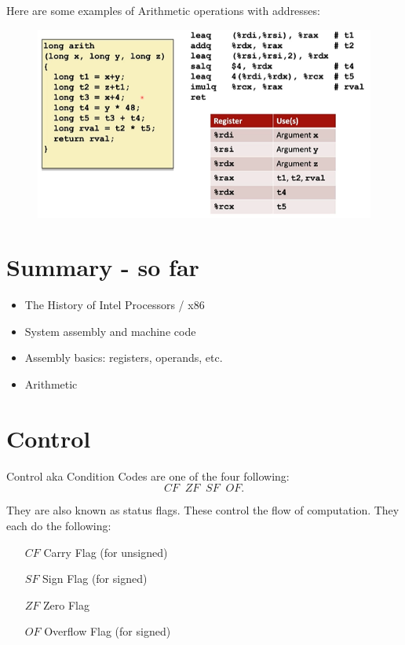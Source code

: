 \documentclass[12pt]{book}
\begin{document}
Here are some examples of Arithmetic operations with addresses:
\begin{figure}[h]
        \centering
        \includegraphics[scale = 0.7]{./figures/arithex}
\end{figure}

\section*{Summary - so far}
\begin{itemize}
        \item The History of Intel Processors / x86
        \item System assembly and machine code
        \item Assembly basics: registers, operands, etc.
        \item Arithmetic
\end{itemize}

\section*{Control}
Control aka Condition Codes are one of the four following:
\[
CF\;\;ZF\;\;SF\;\;OF
.\] 
\pagebreak


They are also known as status flags.
These control the flow of computation. They each do the following:
\begin{itemize}
        \item[$CF$] Carry Flag (for unsigned)
        \item[$SF$] Sign Flag (for signed)
        \item[$ZF$] Zero Flag
        \item[$OF$] Overflow Flag (for signed)
\end{itemize}
\end{document}
